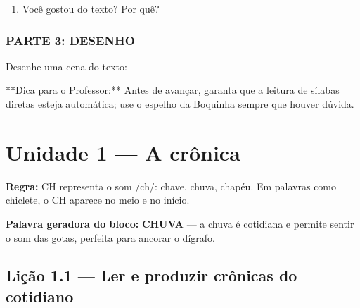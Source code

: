 \begin{exercicio}
\begin{enumerate}
  \item Você gostou do texto? Por quê?
  \begin{center}
  \underline{\hspace{12cm}}
  \end{center}

\end{enumerate}

\subsection*{PARTE 3: DESENHO}

Desenhe uma cena do texto:

\begin{center}
\end{center}

\end{exercicio}

\begin{dica}
**Dica para o Professor:** Antes de avançar, garanta que a leitura de sílabas diretas esteja automática; use o espelho da Boquinha sempre que houver dúvida.
\end{dica}


\chapter{Unidade 1 --- A crônica}


\textbf{Regra:} CH representa o som /ch/: chave, chuva, chapéu. Em palavras como chiclete, o CH aparece no meio e no início.

\textbf{Palavra geradora do bloco:} \textbf{CHUVA} --- a chuva é cotidiana e permite sentir o som das gotas, perfeita para ancorar o dígrafo.

\section{Lição 1.1 --- Ler e produzir crônicas do cotidiano}

